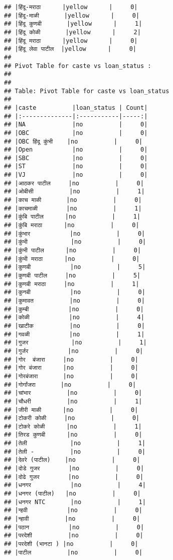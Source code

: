 \documentclass[
]{article}
\begin{document}
\begin{verbatim}
## |हिंदू-मराठा      |yellow      |     0|
## |हिंदू-माळी       |yellow      |     0|
## |हिंदू कुणबी       |yellow      |     1|
## |हिंदू कोळी       |yellow      |     2|
## |हिंदू मराठा      |yellow      |     0|
## |हिंदू लेवा पाटील  |yellow      |     0|
## 
## Pivot Table for caste vs loan_status :
## 
## 
## Table: Pivot Table for caste vs loan_status
## 
## |caste          |loan_status | Count|
## |:--------------|:-----------|-----:|
## |NA             |no          |     0|
## |OBC            |no          |     0|
## |OBC हिंदू कुंभी    |no          |     0|
## |Open           |no          |     0|
## |SBC            |no          |     0|
## |ST             |no          |     0|
## |VJ             |no          |     0|
## |आठकर पाटील     |no          |     0|
## |ओबीसी          |no          |     1|
## |काच माळी       |no          |     0|
## |काचमाळी        |no          |     1|
## |कुंबि पाटील      |no          |     1|
## |कुंबि मराठा      |no          |     0|
## |कुंभार           |no          |     0|
## |कुंभी            |no          |     0|
## |कुंभी पाटील      |no          |     0|
## |कुंभी मराठा      |no          |     0|
## |कुणबी           |no          |     5|
## |कुणबी पाटील     |no          |     5|
## |कुणबी मराठा     |no          |     1|
## |कुनबी           |no          |     0|
## |कुमावत          |no          |     0|
## |कुम्बी           |no          |     0|
## |कोळी           |no          |     4|
## |खाटीक          |no          |     0|
## |गवळी           |no          |     1|
## |गुजर            |no          |     1|
## |गुर्जर           |no          |     0|
## |गोर  बंजारा     |no          |     0|
## |गोर बंजारा      |no          |     0|
## |गोरबंजारा       |no          |     0|
## |गोर्गांजरा       |no          |     0|
## |चांभार          |no          |     0|
## |चौधरी          |no          |     1|
## |जीरी माळी      |no          |     0|
## |टोकरी कोळी     |no          |     0|
## |टोकरे कोळी      |no          |     1|
## |तिरड कुणबी      |no          |     0|
## |तेली            |no          |     1|
## |तेली -          |no          |     0|
## |देवरे (पाटील)    |no          |     0|
## |दोडे गुजर        |no          |     0|
## |दोढे गुजर        |no          |     0|
## |धनगर           |no          |     4|
## |धनगर (पाटील)   |no          |     0|
## |धनगर NTC       |no          |     1|
## |न्हवी           |no          |     0|
## |न्हावी          |no          |     0|
## |पठान           |no          |     0|
## |परदेशी          |no          |     0|
## |परदेशी (भानटा ) |no          |     0|
## |पाटील          |no          |     0|

\end{verbatim}
\end{document}
